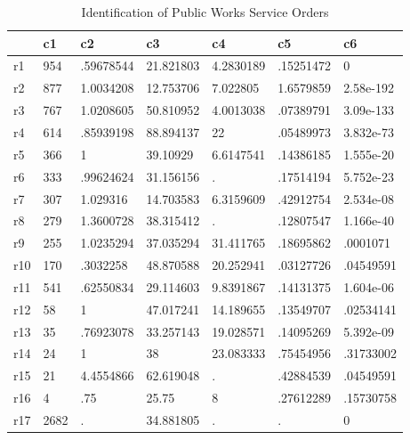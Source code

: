 \begin{table}[htbp]
\caption{\label{clabel} Identification of Public Works Service Orders}\centering\medskip
\begin{tabular}{|l|l|l|l|l|l|l|}\hline  
 & c1  & c2  & c3  & c4  & c5  & c6  \\ \hline  
r1 & 954 & .59678544 & 21.821803 & 4.2830189 & .15251472 & 0 \\ \hline 
r2 & 877 & 1.0034208 & 12.753706 & 7.022805 & 1.6579859 & 2.58e-192 \\ \hline 
r3 & 767 & 1.0208605 & 50.810952 & 4.0013038 & .07389791 & 3.09e-133 \\ \hline 
r4 & 614 & .85939198 & 88.894137 & 22 & .05489973 & 3.832e-73 \\ \hline 
r5 & 366 & 1 & 39.10929 & 6.6147541 & .14386185 & 1.555e-20 \\ \hline 
r6 & 333 & .99624624 & 31.156156 & . & .17514194 & 5.752e-23 \\ \hline 
r7 & 307 & 1.029316 & 14.703583 & 6.3159609 & .42912754 & 2.534e-08 \\ \hline 
r8 & 279 & 1.3600728 & 38.315412 & . & .12807547 & 1.166e-40 \\ \hline 
r9 & 255 & 1.0235294 & 37.035294 & 31.411765 & .18695862 & .0001071 \\ \hline 
r10 & 170 & .3032258 & 48.870588 & 20.252941 & .03127726 & .04549591 \\ \hline 
r11 & 541 & .62550834 & 29.114603 & 9.8391867 & .14131375 & 1.604e-06 \\ \hline 
r12 & 58 & 1 & 47.017241 & 14.189655 & .13549707 & .02534141 \\ \hline 
r13 & 35 & .76923078 & 33.257143 & 19.028571 & .14095269 & 5.392e-09 \\ \hline 
r14 & 24 & 1 & 38 & 23.083333 & .75454956 & .31733002 \\ \hline 
r15 & 21 & 4.4554866 & 62.619048 & . & .42884539 & .04549591 \\ \hline 
r16 & 4 & .75 & 25.75 & 8 & .27612289 & .15730758 \\ \hline 
r17 & 2682 & . & 34.881805 & . & . & 0 \\ \hline 
  \end{tabular}
\end{table}

\endinput
